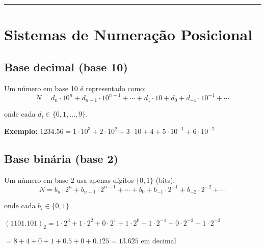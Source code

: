 \documentclass[
  11pt,
  letterpaper,
  DIV=11,
  numbers=noendperiod]{scrartcl}
\begin{document}
\begin{center}\rule{0.5\linewidth}{0.5pt}\end{center}

\section{Sistemas de Numeração
Posicional}\label{sistemas-de-numerauxe7uxe3o-posicional}

\subsection{Base decimal (base 10)}\label{base-decimal-base-10}

Um número em base 10 é representado como:
\[N = d_n \cdot 10^n + d_{n-1} \cdot 10^{n-1} + \cdots + d_1 \cdot 10 + d_0 + d_{-1} \cdot 10^{-1} + \cdots\]

onde cada \(d_i \in \{0, 1, \ldots, 9\}\).

\textbf{Exemplo:}
\(1234.56 = 1 \cdot 10^3 + 2 \cdot 10^2 + 3 \cdot 10 + 4 + 5 \cdot 10^{-1} + 6 \cdot 10^{-2}\)

\subsection{Base binária (base 2)}\label{base-binuxe1ria-base-2}

Um número em base 2 usa apenas dígitos \(\{0, 1\}\) (bits):
\[N = b_n \cdot 2^n + b_{n-1} \cdot 2^{n-1} + \cdots + b_0 + b_{-1} \cdot 2^{-1} + b_{-2} \cdot 2^{-2} + \cdots\]

onde cada \(b_i \in \{0, 1\}\).

\begin{tcolorbox}[enhanced jigsaw, arc=.35mm, bottomrule=.15mm, bottomtitle=1mm, breakable, colback=white, colbacktitle=quarto-callout-tip-color!10!white, colframe=quarto-callout-tip-color-frame, coltitle=black, left=2mm, leftrule=.75mm, opacityback=0, opacitybacktitle=0.6, rightrule=.15mm, title=\textcolor{quarto-callout-tip-color}{\faLightbulb}\hspace{0.5em}{Exemplo}, titlerule=0mm, toprule=.15mm, toptitle=1mm]

\((1101.101)_2 = 1 \cdot 2^3 + 1 \cdot 2^2 + 0 \cdot 2^1 + 1 \cdot 2^0 + 1 \cdot 2^{-1} + 0 \cdot 2^{-2} + 1 \cdot 2^{-3}\)

\(= 8 + 4 + 0 + 1 + 0.5 + 0 + 0.125 = 13.625\) em decimal

\end{tcolorbox}
\end{document}
